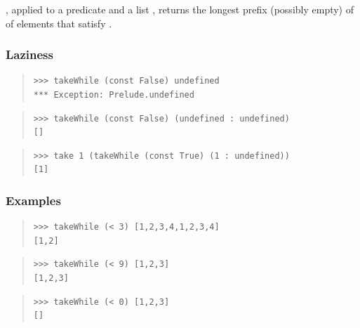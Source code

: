 \begin{haddockdesc}
\item[\begin{tabular}{@{}l}
takeWhile :: (a -> Bool) -> {\char 91}a{\char 93} -> {\char 91}a{\char 93}
\end{tabular}]
{\haddockbegindoc
{}, applied to a predicate  and a list , returns the
 longest prefix (possibly empty) of  of elements that satisfy .\par
\subsubsection*{\textbf{Laziness}}
\begin{quote}
{\haddockverb\begin{verbatim}
>>> takeWhile (const False) undefined
*** Exception: Prelude.undefined

\end{verbatim}}
\end{quote}
\begin{quote}
{\haddockverb\begin{verbatim}
>>> takeWhile (const False) (undefined : undefined)
[]

\end{verbatim}}
\end{quote}
\begin{quote}
{\haddockverb\begin{verbatim}
>>> take 1 (takeWhile (const True) (1 : undefined))
[1]

\end{verbatim}}
\end{quote}
\subsubsection*{\textbf{Examples}}
\begin{quote}
{\haddockverb\begin{verbatim}
>>> takeWhile (< 3) [1,2,3,4,1,2,3,4]
[1,2]

\end{verbatim}}
\end{quote}
\begin{quote}
{\haddockverb\begin{verbatim}
>>> takeWhile (< 9) [1,2,3]
[1,2,3]

\end{verbatim}}
\end{quote}
\begin{quote}
{\haddockverb\begin{verbatim}
>>> takeWhile (< 0) [1,2,3]
[]

\end{verbatim}}
\end{quote}}
\end{haddockdesc}
